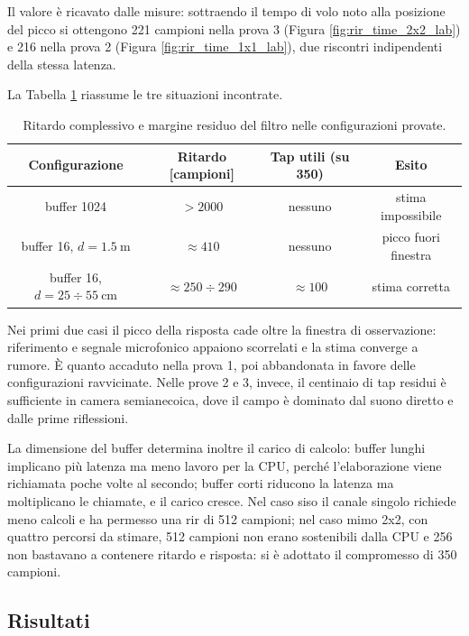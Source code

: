 \documentclass[11pt,a4paper]{article}
\begin{document}
	Il valore è ricavato dalle misure: sottraendo il tempo di volo noto alla posizione del picco si ottengono 221 campioni nella prova 3 (Figura \ref{fig:rir_time_2x2_lab}) e 216 nella prova 2 (Figura \ref{fig:rir_time_1x1_lab}), due riscontri indipendenti della stessa latenza. 
	
	La Tabella \ref{tab:latenza_rt} riassume le tre situazioni incontrate.

	\begin{table}[H]
		\centering
		\renewcommand{\arraystretch}{1.5}
		\begin{tabular}{|c|c|c|c|}
			\hline
			Configurazione & Ritardo [campioni] & Tap utili (su 350) & Esito \\
			\hline
			buffer 1024 & $> 2000$ & nessuno & stima impossibile \\
			\hline
			buffer 16, $d = \SI{1.5}{\meter}$ & $\approx 410$ & nessuno & picco fuori finestra \\
			\hline
			buffer 16, $d = 25 \div \SI{55}{\centi\meter}$ & $\approx 250 \div 290$ & $\approx 100$ & stima corretta \\
			\hline
		\end{tabular}
		\caption{Ritardo complessivo e margine residuo del filtro nelle configurazioni provate.}
		\label{tab:latenza_rt}
	\end{table}

	Nei primi due casi il picco della risposta cade oltre la finestra di osservazione: riferimento e segnale microfonico appaiono scorrelati e la stima converge a rumore.
	È quanto accaduto nella prova 1, poi abbandonata in favore delle configurazioni ravvicinate. 
	Nelle prove 2 e 3, invece, il centinaio di tap residui è sufficiente in camera semianecoica, dove il campo è dominato dal suono diretto e dalle prime riflessioni.

	La dimensione del buffer determina inoltre il carico di calcolo: buffer lunghi implicano più latenza ma meno lavoro per la CPU, perché l'elaborazione viene richiamata poche volte al secondo; buffer corti riducono la latenza ma moltiplicano le chiamate, e il carico cresce.
	Nel caso \ac{siso} il canale singolo richiede meno calcoli e ha permesso una \ac{rir} di 512 campioni; nel caso \ac{mimo} 2x2, con quattro percorsi da stimare, 512 campioni non erano sostenibili dalla CPU e 256 non bastavano a contenere ritardo e risposta: si è adottato il compromesso di 350 campioni.
	
	\newpage

	\subsection{Risultati}
\end{document}
